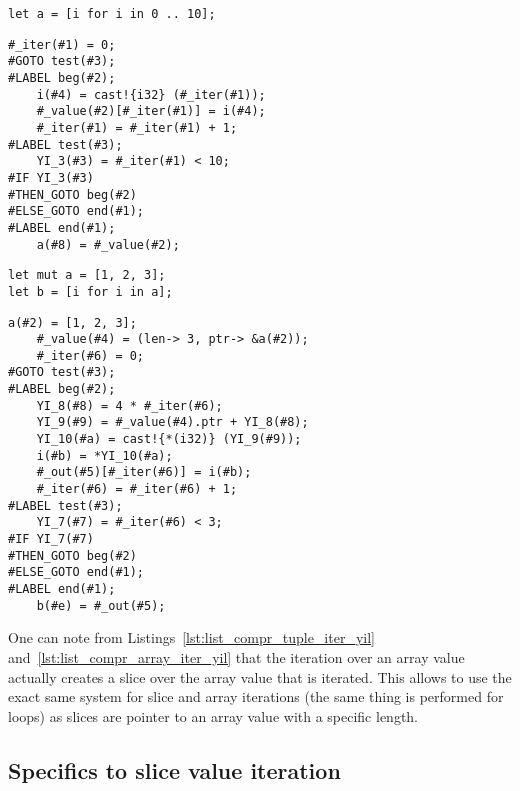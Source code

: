 \begin{lstlisting}[style=coloredverbatim, label=lst:list_compr_range_iter, caption=List comprehension iterating over a range]
let a = [i for i in 0 .. 10];
\end{lstlisting}

\begin{lstlisting}[style=lyilVerb, label=lst:list_compr_range_iter_yil, caption=YIL representation of Listing~\ref{lst:list_compr_range_iter}]
    #_iter(#1) = 0;
#GOTO test(#3);
#LABEL beg(#2);
    i(#4) = cast!{i32} (#_iter(#1));
    #_value(#2)[#_iter(#1)] = i(#4);
    #_iter(#1) = #_iter(#1) + 1;
#LABEL test(#3);
    YI_3(#3) = #_iter(#1) < 10;
#IF YI_3(#3)
#THEN_GOTO beg(#2)
#ELSE_GOTO end(#1);
#LABEL end(#1);
    a(#8) = #_value(#2);
\end{lstlisting}

\begin{lstlisting}[style=coloredverbatim, label=lst:list_compr_array_iter, caption=List comprehension iterating over an array]
let mut a = [1, 2, 3];
let b = [i for i in a];
\end{lstlisting}

\begin{lstlisting}[style=lyilVerb, label=lst:list_compr_array_iter_yil, caption=YIL representation of Listing~\ref{lst:list_compr_array_iter}]
    a(#2) = [1, 2, 3];
    #_value(#4) = (len-> 3, ptr-> &a(#2));
    #_iter(#6) = 0;
#GOTO test(#3);
#LABEL beg(#2);
    YI_8(#8) = 4 * #_iter(#6);
    YI_9(#9) = #_value(#4).ptr + YI_8(#8);
    YI_10(#a) = cast!{*(i32)} (YI_9(#9));
    i(#b) = *YI_10(#a);
    #_out(#5)[#_iter(#6)] = i(#b);
    #_iter(#6) = #_iter(#6) + 1;
#LABEL test(#3);
    YI_7(#7) = #_iter(#6) < 3;
#IF YI_7(#7)
#THEN_GOTO beg(#2)
#ELSE_GOTO end(#1);
#LABEL end(#1);
    b(#e) = #_out(#5);
\end{lstlisting}

One can note from Listings~\ref{lst:list_compr_tuple_iter_yil}
and~\ref{lst:list_compr_array_iter_yil} that the iteration over an array value
actually creates a slice over the array value that is iterated. This allows to
use the exact same system for slice and array iterations (the same thing is
performed for  loops) as slices are pointer to an array value with a
specific length.

\subsection{Specifics to slice value iteration}


